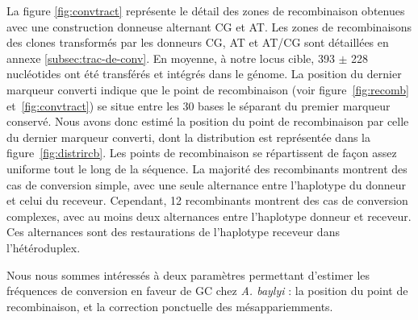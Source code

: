 La figure \ref{fig:convtract} représente le détail des zones de recombinaison
obtenues avec une construction donneuse alternant CG et AT. Les zones de
recombinaisons des clones transformés par les donneurs CG, AT et AT/CG sont
détaillées en annexe \ref{subsec:trac-de-conv}. En moyenne, à notre locus cible,
\num{393} \(\pm\) \num{228} nucléotides ont été transférés et intégrés dans le
génome. La position du dernier marqueur converti indique que le point de
recombinaison (voir figure~\ref{fig:recomb} et~\ref{fig:convtract}) se situe
entre les 30 bases le séparant du premier marqueur conservé. Nous avons donc
estimé la position du point de recombinaison par celle du dernier marqueur
converti, dont la distribution est représentée dans la
figure~\ref{fig:distrircb}. Les points de recombinaison se répartissent de façon
assez uniforme tout le long de la séquence. La majorité des recombinants
montrent des cas de conversion simple, avec une seule alternance entre
l'haplotype du donneur et celui du receveur. Cependant, 12 recombinants montrent
des cas de conversion complexes, avec au moins deux alternances entre
l'haplotype donneur et receveur. Ces alternances sont des restaurations de
l'haplotype receveur dans l'hétéroduplex.

Nous nous sommes intéressés à deux paramètres permettant d'estimer les
fréquences de conversion en faveur de GC chez \emph{A. baylyi} : la position du
point de recombinaison, et la correction ponctuelle des mésappariemments.

